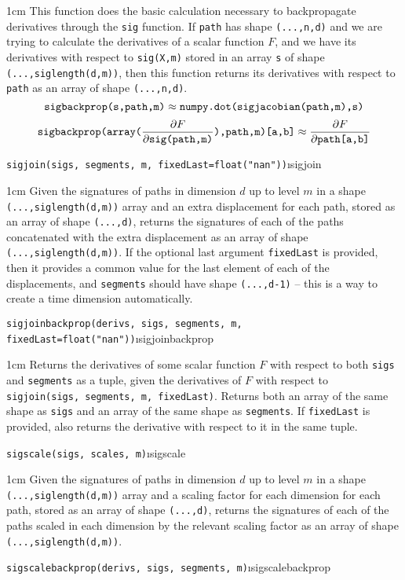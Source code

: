 \documentclass[a4paper]{extarticle}
\newenvironment{defn}{\begin{adjustwidth}{1cm}{}\ignorespaces}{\end{adjustwidth}\ignorespacesafterend}
\begin{document}
\begin{defn}
\nopagebreak This function does the basic calculation necessary to backpropagate derivatives through the \verb|sig| function. If \verb|path| has shape \verb|(...,n,d)| and we are trying to calculate the derivatives of a scalar function $F$, and we have its derivatives with respect to \verb|sig(X,m)| stored in an array \verb|s| of shape \verb|(...,siglength(d,m))|, then this function returns its derivatives with respect to \verb|path| as an array of shape \verb|(...,n,d)|.
\[\verb|sigbackprop(s,path,m)|
 \approx
  \verb|numpy.dot(sigjacobian(path,m),s)|
 \]
\[\verb|sigbackprop(array(|{\partial F \over \partial \verb|sig(path,m)|}\verb|),path,m)[a,b]| \approx {\partial F \over \partial \verb|path[a,b]|}
 \]
\end{defn}
\verb!sigjoin(sigs, segments, m, fixedLast=float("nan"))!\i{sigjoin}

\begin{defn}
\nopagebreak Given the signatures of paths in dimension $d$ up to level $m$ in a shape \verb|(...,siglength(d,m))| array and an extra displacement for each path, stored as an array of shape \verb|(...,d)|, returns the signatures of each of the paths concatenated with the extra displacement as an array of shape \verb|(...,siglength(d,m))|. If the optional last argument \verb|fixedLast| is provided, then it provides a common value for the last element of each of the displacements, and \verb|segments| should have shape \verb|(...,d-1)| -- this is a way to create a time dimension automatically.
\end{defn}
\verb!sigjoinbackprop(derivs, sigs, segments, m, fixedLast=float("nan"))!\i{sigjoinbackprop}

\begin{defn}
\nopagebreak Returns the derivatives of some scalar function $F$ with respect to both \verb|sigs| and \verb|segments| as a tuple, given %
the derivatives of $F$ with respect to \verb!sigjoin(sigs, segments, m, fixedLast)!. Returns both an array of the same shape as \verb|sigs| and an array of the same shape as \verb|segments|. If \verb|fixedLast| is provided, also returns the derivative with respect to it in the same tuple.
\end{defn}
\verb!sigscale(sigs, scales, m)!\i{sigscale}
\begin{defn}
	\nopagebreak Given the signatures of paths in dimension $d$ up to level $m$ in a shape \verb|(...,siglength(d,m))| array and a scaling factor for each dimension for each path, stored as an array of shape \verb|(...,d)|, returns the signatures of each of the paths scaled in each dimension by the relevant scaling factor as an array of shape \verb|(...,siglength(d,m))|. 
\end{defn}
\verb!sigscalebackprop(derivs, sigs, segments, m)!\i{sigscalebackprop}
\end{document}
